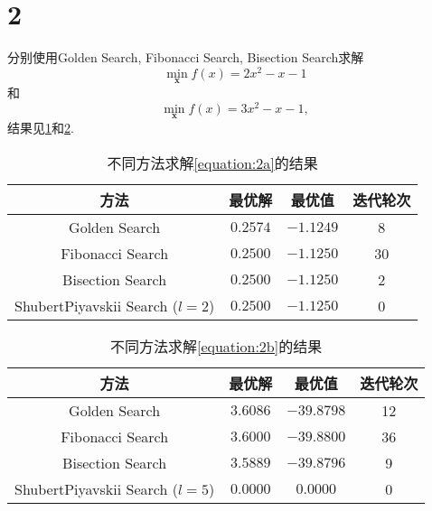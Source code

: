 \section*{2}

分别使用Golden Search, Fibonacci Search, Bisection Search求解
\begin{equation}
    \min_{\bm{x}} f(x)=2x^2-x-1
    \label{equation:2a}
\end{equation}
和
\begin{equation}
    \min_{\bm{x}} f(x)=3x^2-x-1,
    \label{equation:2b}
\end{equation}
结果见\cref{table:2a}和\cref{table:2b}.

\begin{table}[ht]
    \centering
    \caption{不同方法求解\cref{equation:2a}的结果}
    \label{table:2a}
    \begin{tabular}{cccc}
        \toprule
        方法 & 最优解 & 最优值 & 迭代轮次 \\
        \midrule
        Golden Search & $0.2574$ & $-1.1249$ & 8 \\
        Fibonacci Search & $0.2500$ & $-1.1250$ & 30 \\
        Bisection Search & $0.2500$ & $-1.1250$ & 2 \\
        ShubertPiyavskii Search ($l=2$) & $0.2500$ & $-1.1250$ & 0 \\
        \bottomrule
    \end{tabular}
\end{table}


\begin{table}[ht]
    \centering
    \caption{不同方法求解\cref{equation:2b}的结果}
    \label{table:2b}
    \begin{tabular}{cccc}
        \toprule
        方法 & 最优解 & 最优值 & 迭代轮次 \\
        \midrule
        Golden Search & $3.6086$ & $-39.8798$ & 12 \\
        Fibonacci Search & $3.6000$ & $-39.8800$ & 36 \\
        Bisection Search & $3.5889$ & $-39.8796$ & 9 \\
        ShubertPiyavskii Search ($l=5$) & $0.0000$ & $0.0000$ & 0 \\
        \bottomrule
    \end{tabular}
\end{table}
